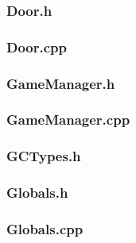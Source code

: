 \documentclass{article}
\begin{document}
\subsubsection{Door.h}
	

\subsubsection{Door.cpp}
	
 				
\subsubsection{GameManager.h}
	

\subsubsection{GameManager.cpp}
	
	 				
\subsubsection{GCTypes.h}
	
	 				
\subsubsection{Globals.h}
	 
	 				
\subsubsection{Globals.cpp}
	 
	 				
\end{document}
